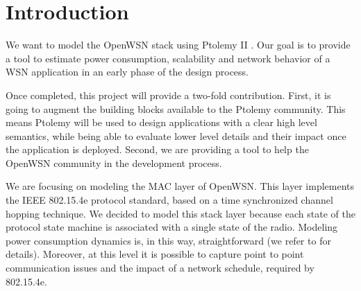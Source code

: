 \section{Introduction}
We want to model the OpenWSN \cite{watteyne2012openwsn} stack using Ptolemy II \cite{davis1999overview}. Our goal is to provide a tool to estimate power consumption, scalability and network behavior of a WSN application in an early phase of the design process.

Once completed, this project will provide a two-fold contribution. First, it is going to augment the building blocks available to the Ptolemy community. This means Ptolemy will be used to design applications with a clear high level semantics, while being able to evaluate lower level details and their impact once the application is deployed. Second, we are providing a tool to help the OpenWSN community in the development process.

We are focusing on modeling the MAC layer of OpenWSN. This layer implements the IEEE 802.15.4e protocol standard, based on a time synchronized channel hopping technique. We decided to model this stack layer because each state of the protocol state machine is associated with a single state of the radio. Modeling power consumption dynamics is, in this way, straightforward (we refer to \cite{vilajosana2013realistic} for details). Moreover, at this level it is possible to capture point to point communication issues and the impact of a network schedule, required by 802.15.4e. 

